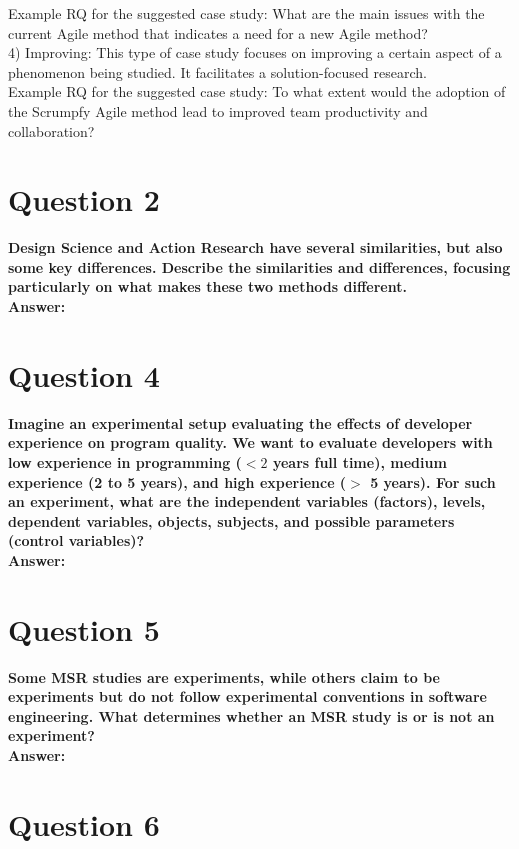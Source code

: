 \documentclass[conference]{IEEEtran}
\begin{document}
Example RQ for the suggested case study: What are the main issues with the current Agile method that indicates a need for a new Agile method?\\

4) Improving: This type of case study focuses on improving a certain aspect of a phenomenon being studied. It facilitates a solution-focused research.\\

Example RQ for the suggested case study: To what extent would the adoption of the Scrumpfy Agile method lead to improved team productivity and collaboration?

\section{Question 2}

\textbf{Design Science and Action Research have several similarities, but also some key differences. Describe the similarities and differences, focusing particularly on what makes these two methods different.}\\

\textbf{Answer:}

\section{Question 4}

\textbf{Imagine an experimental setup evaluating the effects of developer experience on program quality. We want to evaluate developers with low experience in programming ($<2$ years full time), medium experience (2 to 5 years), and high experience ($>$ 5 years). For such an experiment, what are the independent variables (factors), levels, dependent variables, objects, subjects, and possible parameters (control variables)?}\\

\textbf{Answer:}

\section{Question 5}

\textbf{Some MSR studies are experiments, while others claim to be experiments but do not follow experimental conventions in software engineering. What determines whether an MSR study is or is not an experiment?}\\

\textbf{Answer:}

\section{Question 6}
\end{document}
